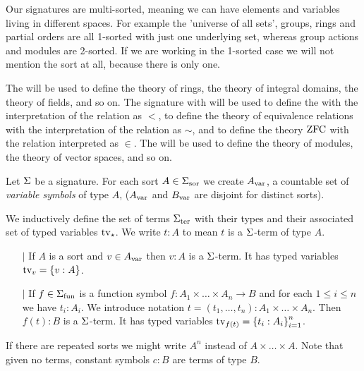     Our signatures are multi-sorted, meaning we can have elements and 
    variables living in different spaces. 
    For example the 'universe of all sets', 
    groups, rings and partial orders are all 1-sorted with just one
    underlying set, whereas group actions and modules are 2-sorted.
    If we are working in the 1-sorted case we will not mention the sort at all,
    because there is only one.
    
\begin{eg}
    The  
    will be used to define the theory of rings, 
    the theory of integral domains, the theory of fields, and so on.
    The signature with 
    will be used to define the 
    with the interpretation of the relation as $<$, 
    to define the theory of equivalence relations with the 
    interpretation of the relation as $\sim$,
    and to define the theory $\operatorname{ZFC}$ with the relation interpreted as $\in$.
    The  %
    will be used to define the theory of modules,
    the theory of vector spaces, and so on.
\end{eg}

\begin{dfn}[$\Si$-terms]
    Let $\Si$ be a signature. 
    For each sort $A \in {\Sigma}_\mathrm{sor}$ we create 
    ${A}_\mathrm{var}$, a countable set of \textit{variable symbols} of type $A$, 
    (${A}_\mathrm{var}$ and ${B}_\mathrm{var}$ are disjoint for distinct sorts).
    
    We inductively define the set of terms
    ${\Sigma}_\mathrm{ter}$ with their types and their 
    associated set of typed variables $\textrm{tv}_{\star}$. 
    We write $t : A$ to mean $t$ is a $\Si$-term of type $A$.
    \begin{itemize}
        \item[$\vert$] If $A$ is a sort and $v \in {A}_\mathrm{var}$ then 
        $v : A$ is a $\Si$-term.
        It has typed variables $\textrm{tv}_{v} = \left\{v : A\right\}$.
        \item[$\vert$] If $f \in {\Sigma}_\mathrm{fun}$ is a function symbol 
            $f : A_1 \times \dots \times A_n \to B$ and for each 
            $1 \leq i \leq n$ we have 
            $t_i : A_i$.
            We introduce notation 
            $t = (t_1,\dots,t_n) : A_1 \times \dots \times A_n$.
            Then $f(t) : B$ is a $\Si$-term.
            It has typed variables $\textrm{tv}_{f(t)} = \left\{t_i : A_i\right\}_{i=1}^n$.
    \end{itemize}
    
    If there are repeated sorts we might write 
    $A^n$ instead of $A \times \dots \times A$.
    Note that given no terms, constant symbols $c : B$ are terms of type $B$.
\end{dfn}

